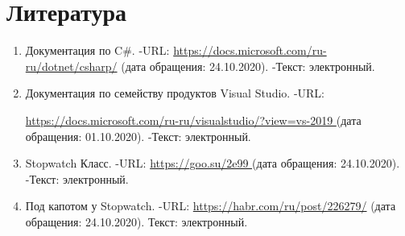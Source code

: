 \documentclass[14pt, a4paper]{extarticle}
\begin{document}
\section*{Литература}
\begin{enumerate}
	\label{literature}
	\item  Документация по C\#. -URL: \href{https://docs.microsoft.com/ru-ru/dotnet/csharp/}{https://docs.microsoft.com/ru-ru/dotnet/csharp/} (дата обращения: 24.10.2020). -Текст: электронный.
	\item Документация по семейству продуктов Visual Studio. -URL:\par \href{https://docs.microsoft.com/ru-ru/visualstudio/?view=vs-2019}{https://docs.microsoft.com/ru-ru/visualstudio/?view=vs-2019 } (дата обращения: 01.10.2020). -Текст: электронный.
	\item Stopwatch Класс. -URL: \href{https://goo.su/2e99}{https://goo.su/2e99 } (дата обращения: 24.10.2020). -Текст: электронный.
	\item Под капотом у Stopwatch. -URL:  \href{https://habr.com/ru/post/226279/}{https://habr.com/ru/post/226279/} (дата обращения: 24.10.2020). Текст: электронный.
\end{enumerate}
\end{document}

